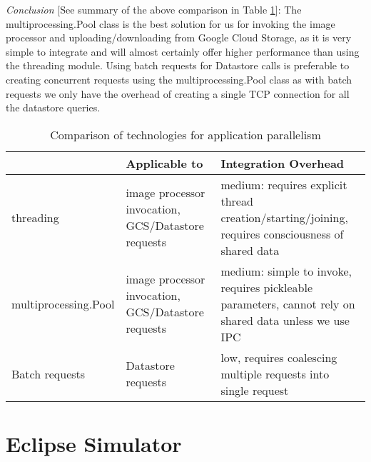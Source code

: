 \documentclass[10pt, onecolumn, draftclsnofoot, letterpaper, compsoc]{IEEEtran}
\begin{document}
\textit{Conclusion} [See summary of the above comparison in Table \ref{table:bret3}]:
The multiprocessing.Pool class is the best solution for us 
for invoking the image processor and uploading/downloading from Google Cloud 
Storage, as it is very simple to integrate and will almost certainly offer 
higher performance than using the threading module. Using batch requests for 
Datastore calls is preferable to creating concurrent requests using the 
multiprocessing.Pool class as with batch requests we only have the overhead 
of creating a single TCP connection for all the datastore queries.

\begin{table}[h]
\centering
\caption{Comparison of technologies for application parallelism}
\begin{tabular}{|p{4.2cm}|p{4.2cm}|p{4.2cm}|}
\cline{3-3}
\hline

 & Applicable to & Integration Overhead \\ \hline

threading & image processor invocation, GCS/Datastore requests 
& medium: requires explicit thread creation/starting/joining, 
requires consciousness of shared data \\ \hline

multiprocessing.Pool & image processor invocation, GCS/Datastore requests
& medium: simple to invoke, requires pickleable parameters, cannot rely 
on shared data unless we use IPC \\ \hline

Batch requests & Datastore requests & low, requires coalescing multiple 
requests into single request  \\ \hline

\end{tabular}
\label{table:bret3}
\end{table}

\section{Eclipse Simulator}




\end{document}
